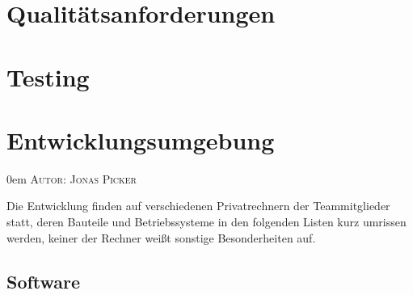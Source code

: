 \documentclass{article}
\makeatletter
\newcommand{\sectionauthor}[1]{
	{\parindent 0em \large \scshape Autor: #1 \par \nobreak \vspace*{2em}}
	\@afterheading
}
\makeatother
\begin{document}
\newpage

\section{Qualitätsanforderungen} %

\newpage

\section{Testing} %

\newpage

\section{Entwicklungsumgebung} %
\sectionauthor{Jonas Picker}

Die Entwicklung finden auf verschiedenen Privatrechnern der Teammitglieder statt, deren Bauteile und Betriebssysteme in den folgenden Listen kurz umrissen werden, keiner der Rechner weißt sonstige Besonderheiten auf. 

\subsection{Software}
\end{document}
